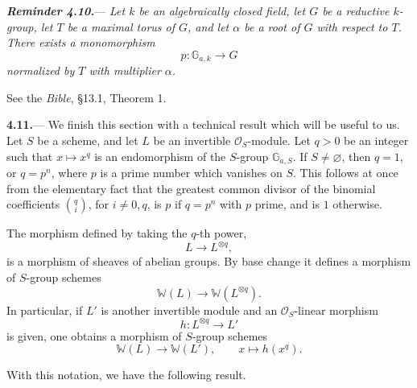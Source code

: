 
\par\medskip\noindent
\textbf{\textit{Reminder 4.10.}}---
\textit{Let \(k\) be an algebraically closed field, let \(G\) be a
reductive \(k\)-group, let \(T\) be a maximal torus of \(G\), and let
\(\alpha\) be a root of \(G\) with respect to \(T\).  There exists a
monomorphism}
\[
  p\colon\mathbb G_{a,k}\longrightarrow G
\]
\textit{normalized by \(T\) with multiplier \(\alpha\).}

See the \emph{Bible}, §13.1, Theorem 1.

\par\medskip\noindent
\textbf{4.11.}---
We finish this section with a technical result which will be useful
to us.  Let \(S\) be a scheme, and let \(L\) be an invertible
\(\mathcal O_S\)-module.  Let \(q>0\) be an integer such that
\(x\longmapsto x^q\) is an endomorphism of the \(S\)-group
\(\mathbb G_{a,S}\).  If \(S\ne\varnothing\), then \(q=1\), or
\(q=p^n\), where \(p\) is a prime number which vanishes on \(S\).
This follows at once from the elementary fact that the greatest
common divisor of the binomial coefficients
\(\binom qi\), for \(i\ne0,q\), is \(p\) if \(q=p^n\) with \(p\)
prime, and is \(1\) otherwise.

The morphism defined by taking the \(q\)-th power,
\[
  L\longrightarrow L^{\otimes q},
\]
is a morphism of sheaves of abelian groups.  By base change it
defines a morphism of \(S\)-group schemes
\[
  \mathbb W(L)\longrightarrow\mathbb W(L^{\otimes q}).
\]
In particular, if \(L'\) is another invertible module and an
\(\mathcal O_S\)-linear morphism
\[
  h\colon L^{\otimes q}\longrightarrow L'
\]
is given, one obtains a morphism of \(S\)-group schemes
\[
  \mathbb W(L)\longrightarrow\mathbb W(L'),
  \qquad
  x\longmapsto h(x^q).
\]

With this notation, we have the following result.

